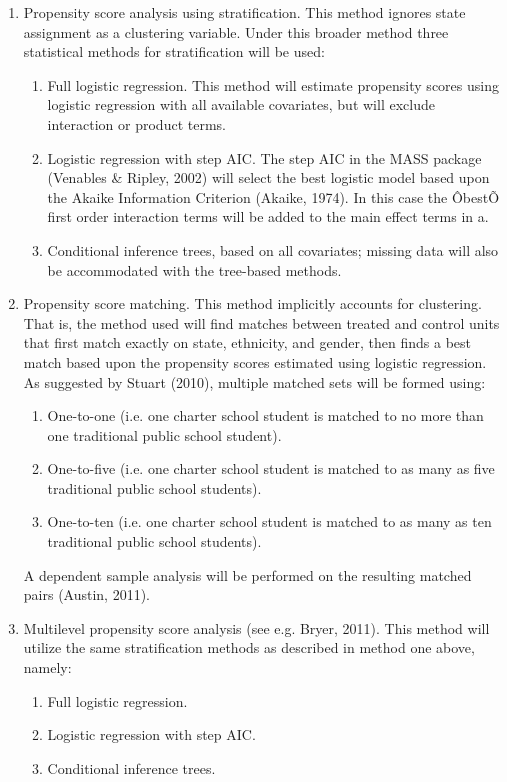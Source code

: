 \documentclass[letterpaper,12p,twoside]{article} %
\begin{document}
\begin{enumerate}
\item Propensity score analysis using stratification. This method ignores state assignment as a clustering variable. Under this broader method three statistical methods for stratification will be used:
	\begin{enumerate}
	\item Full logistic regression. This method will estimate propensity scores using logistic regression with all available covariates, but will exclude interaction or product terms.
	\item Logistic regression with step AIC. The step AIC in the MASS package (Venables \& Ripley, 2002) will select the best logistic model based upon the Akaike Information Criterion (Akaike, 1974). In this case the ÔbestÕ first order interaction terms will be added to the main effect terms in a.
	\item Conditional inference trees, based on all covariates; missing data will also be accommodated with the tree-based methods.
	\end{enumerate}
\item Propensity score matching. This method implicitly accounts for clustering. That is, the method used will find matches between treated and control units that first match exactly on state, ethnicity, and gender, then finds a best match based upon the propensity scores estimated using logistic regression. As suggested by Stuart (2010), multiple matched sets will be formed using:
	\begin{enumerate}
	\item One-to-one (i.e. one charter school student is matched to no more than one traditional public school student).
	\item One-to-five (i.e. one charter school student is matched to as many as five traditional public school students).
	\item One-to-ten (i.e. one charter school student is matched to as many as ten traditional public school students).
	\end{enumerate}
	A dependent sample analysis will be performed on the resulting matched pairs (Austin, 2011).
\item Multilevel propensity score analysis (see e.g. Bryer, 2011). This method will utilize the same stratification methods as described in method one above, namely:
	\begin{enumerate}
	\item Full logistic regression.
	\item Logistic regression with step AIC.
	\item Conditional inference trees.
	\end{enumerate}
\end{enumerate}
\end{document}
